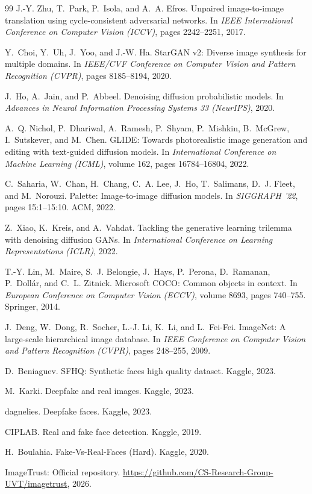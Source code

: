 \documentclass[12pt,a4paper]{book}
\theoremstyle{definition}
\theoremstyle{remark}
\begin{document}
\begin{thebibliography}{99}
J.-Y. Zhu, T.~Park, P.~Isola, and A.~A. Efros.
\newblock Unpaired image-to-image translation using cycle-consistent adversarial networks.
\newblock In \emph{IEEE International Conference on Computer Vision (ICCV)}, pages 2242--2251, 2017.

Y.~Choi, Y.~Uh, J.~Yoo, and J.-W. Ha.
\newblock StarGAN v2: Diverse image synthesis for multiple domains.
\newblock In \emph{IEEE/CVF Conference on Computer Vision and Pattern Recognition (CVPR)}, pages 8185--8194, 2020.

J.~Ho, A.~Jain, and P.~Abbeel.
\newblock Denoising diffusion probabilistic models.
\newblock In \emph{Advances in Neural Information Processing Systems 33 (NeurIPS)}, 2020.

A.~Q. Nichol, P.~Dhariwal, A.~Ramesh, P.~Shyam, P.~Mishkin, B.~McGrew, I.~Sutskever, and M.~Chen.
\newblock GLIDE: Towards photorealistic image generation and editing with text-guided diffusion models.
\newblock In \emph{International Conference on Machine Learning (ICML)}, volume 162, pages 16784--16804, 2022.

C.~Saharia, W.~Chan, H.~Chang, C.~A. Lee, J.~Ho, T.~Salimans, D.~J. Fleet, and M.~Norouzi.
\newblock Palette: Image-to-image diffusion models.
\newblock In \emph{SIGGRAPH '22}, pages 15:1--15:10. ACM, 2022.

Z.~Xiao, K.~Kreis, and A.~Vahdat.
\newblock Tackling the generative learning trilemma with denoising diffusion GANs.
\newblock In \emph{International Conference on Learning Representations (ICLR)}, 2022.

T.-Y. Lin, M.~Maire, S.~J. Belongie, J.~Hays, P.~Perona, D.~Ramanan, P.~Doll\'{a}r, and C.~L. Zitnick.
\newblock Microsoft COCO: Common objects in context.
\newblock In \emph{European Conference on Computer Vision (ECCV)}, volume 8693, pages 740--755. Springer, 2014.

J.~Deng, W.~Dong, R.~Socher, L.-J. Li, K.~Li, and L.~Fei-Fei.
\newblock ImageNet: A large-scale hierarchical image database.
\newblock In \emph{IEEE Conference on Computer Vision and Pattern Recognition (CVPR)}, pages 248--255, 2009.

D.~Beniaguev.
\newblock SFHQ: Synthetic faces high quality dataset.
\newblock Kaggle, 2023.

M.~Karki.
\newblock Deepfake and real images.
\newblock Kaggle, 2023.

dagnelies.
\newblock Deepfake faces.
\newblock Kaggle, 2023.

{CIPLAB}.
\newblock Real and fake face detection.
\newblock Kaggle, 2019.

H.~Boulahia.
\newblock Fake-Vs-Real-Faces (Hard).
\newblock Kaggle, 2020.

ImageTrust: Official repository.
\newblock \url{https://github.com/CS-Research-Group-UVT/imagetrust}, 2026.

\end{thebibliography}
\end{document}

